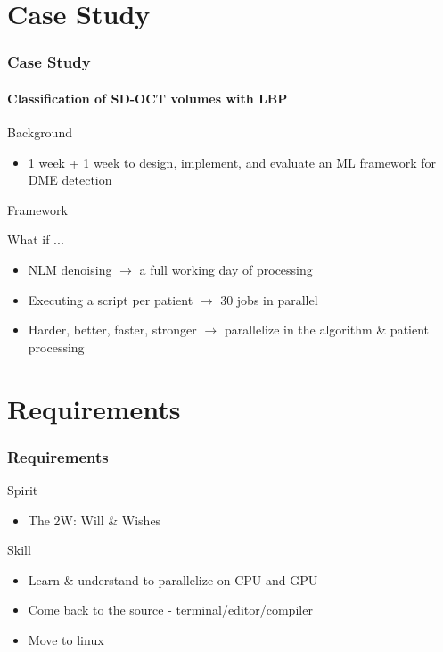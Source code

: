 \documentclass{beamer}
\begin{document}
\section{Case Study}

\begin{frame}
  \frametitle{Case Study}
  \framesubtitle{Classification of SD-OCT volumes with LBP}
  \begin{block}{Background}\footnotesize
      \begin{itemize}
      \item 1 week + 1 week to design, implement, and evaluate an ML framework for DME detection
      \end{itemize}
  \end{block}
  \begin{block}{Framework}\footnotesize
      \begin{figure}
      \end{figure}
  \end{block}
  \begin{block}{What if ...}\footnotesize
    \begin{itemize}
    \item NLM denoising $\rightarrow$ a full working day of processing
    \item Executing a script per patient $\rightarrow$ 30 jobs in parallel
    \item Harder, better, faster, stronger $\rightarrow$ parallelize in the algorithm \& patient processing
    \end{itemize}
  \end{block}
\end{frame}

\section{Requirements}

\begin{frame}
  \frametitle{Requirements}
  \begin{block}{Spirit}\footnotesize
      \begin{itemize}
      \item The 2W: Will \& Wishes
      \end{itemize}
  \end{block}
  \begin{block}{Skill}\footnotesize
      \begin{itemize}
      \item Learn \& understand to parallelize on CPU and GPU
      \item Come back to the source - terminal/editor/compiler
      \item Move to linux
      \end{itemize}
  \end{block}
\end{frame}
\end{document}
